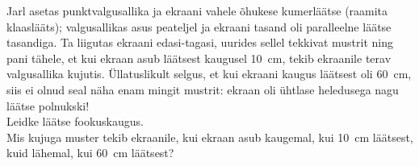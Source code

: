 
Jarl asetas punktvalgusallika ja ekraani vahele õhukese kumerläätse (raamita klaaslääts); valgusallikas asus peateljel ja ekraani tasand oli paralleelne läätse tasandiga. Ta liigutas ekraani edasi-tagasi, uurides sellel tekkivat mustrit ning pani tähele, et kui ekraan asub läätsest kaugusel \SI{10}{\cm}, tekib ekraanile terav valgusallika kujutis. Üllatuslikult selgus, et kui ekraani kaugus läätsest oli \SI{60}{\cm}, siis ei olnud seal näha enam mingit mustrit: ekraan oli ühtlase heledusega nagu läätse polnukski!\\
\osa Leidke läätse fookuskaugus.\\
\osa Mis kujuga muster tekib ekraanile, kui ekraan asub kaugemal, kui \SI{10}{\cm} läätsest, kuid lähemal, kui \SI{60}{\cm} läätsest?



\hint

